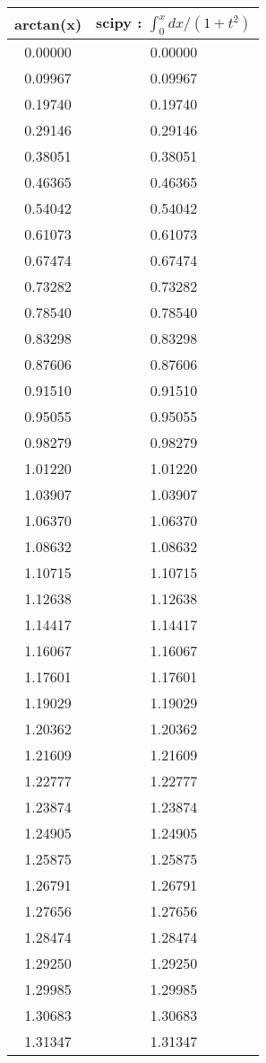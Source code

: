 \documentclass[a4paper]{report}
\begin{document}
   \begin{table}[H]
\begin{tabular}{|c|c|}
\hline
arctan(x) & scipy : $\int_{0}^{x} dx/(1+t^{2}) $  \\
\hline
0.00000 & 0.00000 \\
 0.09967 & 0.09967 \\
 0.19740 & 0.19740 \\
 0.29146 & 0.29146 \\
 0.38051 & 0.38051 \\
 0.46365 & 0.46365 \\
 0.54042 & 0.54042 \\
 0.61073 & 0.61073 \\
 0.67474 & 0.67474 \\
 0.73282 & 0.73282 \\
 0.78540 & 0.78540 \\
 0.83298 & 0.83298 \\
 0.87606 & 0.87606 \\
 0.91510 & 0.91510 \\
 0.95055 & 0.95055 \\
 0.98279 & 0.98279 \\
 1.01220 & 1.01220 \\
 1.03907 & 1.03907 \\
 1.06370 & 1.06370 \\
 1.08632 & 1.08632 \\
 1.10715 & 1.10715 \\
 1.12638 & 1.12638 \\
 1.14417 & 1.14417 \\
 1.16067 & 1.16067 \\
 1.17601 & 1.17601 \\
 1.19029 & 1.19029 \\
 1.20362 & 1.20362 \\
 1.21609 & 1.21609 \\
 1.22777 & 1.22777 \\
 1.23874 & 1.23874 \\
 1.24905 & 1.24905 \\
 1.25875 & 1.25875 \\
 1.26791 & 1.26791 \\
 1.27656 & 1.27656 \\
 1.28474 & 1.28474 \\
 1.29250 & 1.29250 \\
 1.29985 & 1.29985 \\
 1.30683 & 1.30683 \\
 1.31347 & 1.31347 \\

\end{tabular}
\end{table}
\end{document}

